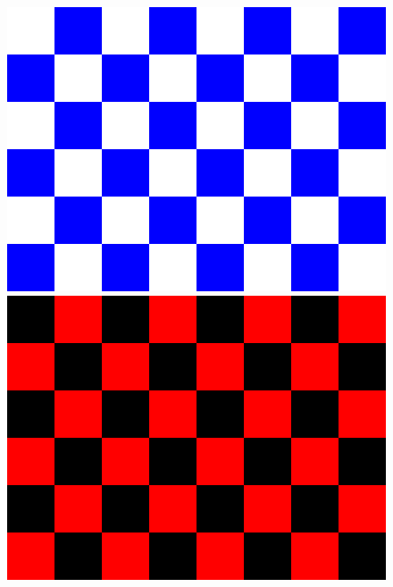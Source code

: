\documentclass[12pt]{article}
\begin{document}
\begin{figure}[htbp]
  \centering
  \begin{minipage}[b]{0.3\textwidth}
    \centering
    \includegraphics[width=\textwidth]{img/blank_blue.png}
  \end{minipage}
  \hfill
  \begin{minipage}[b]{0.3\textwidth}
    \centering
    \includegraphics[width=\textwidth]{img/blank_red.png}
  \end{minipage}
  \hfill
  \begin{minipage}[b]{0.3\textwidth}
    \centering

\end{minipage}
\end{figure}
\end{document}
